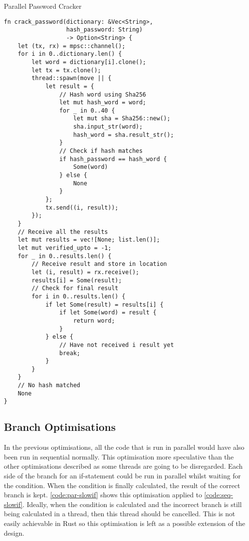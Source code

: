 \documentclass[conference]{IEEEtran}
\begin{document}
\begin{algorithm}
\caption{Parallel Password Cracker}
\label{code:par-password}
\begin{verbatim}
fn crack_password(dictionary: &Vec<String>,
                  hash_password: String)
                  -> Option<String> {
    let (tx, rx) = mpsc::channel();
    for i in 0..dictionary.len() {
        let word = dictionary[i].clone();
        let tx = tx.clone();
        thread::spawn(move || {
            let result = {
                // Hash word using Sha256
                let mut hash_word = word;
                for _ in 0..40 {
                    let mut sha = Sha256::new();
                    sha.input_str(word);
                    hash_word = sha.result_str();
                }
                // Check if hash matches
                if hash_password == hash_word {
                    Some(word)
                } else {
                    None
                }
            };
            tx.send((i, result));
        });
    }
    // Receive all the results
    let mut results = vec![None; list.len()];
    let mut verified_upto = -1;
    for _ in 0..results.len() {
        // Receive result and store in location
        let (i, result) = rx.receive();
        results[i] = Some(result);
        // Check for final result
        for i in 0..results.len() {
            if let Some(result) = results[i] {
                if let Some(word) = result {
                    return word;
                }
            } else {
                // Have not received i result yet
                break;
            }
        }
    }
    // No hash matched
    None
}
\end{verbatim}
\end{algorithm}

\subsection{Branch Optimisations}
In the previous optimisations, all the code that is run in parallel would have also been run in sequential normally. This optimisation more speculative than the other optimisations described as some threads are going to be disregarded. Each side of the branch for an if-statement could be run in parallel whilst waiting for the condition. When the condition is finally calculated, the result of the correct branch is kept. \autoref{code:par-slowif} shows this optimisation applied to \autoref{code:seq-slowif}. Ideally, when the condition is calculated and the incorrect branch is still being calculated in a thread, then this thread should be cancelled. This is not easily achievable in Rust so this optimisation is left as a possible extension of the design.
\end{document}
